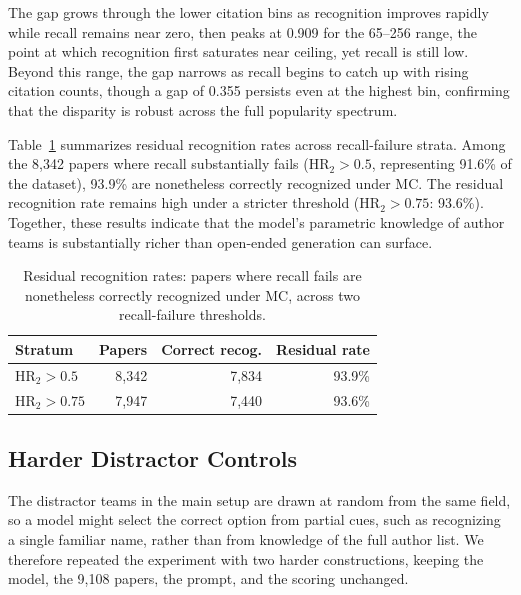\documentclass[11pt]{article}
\begin{document}
The gap grows through the lower citation bins as recognition improves rapidly while recall remains near zero, then peaks at 0.909 for the 65--256 range, the point at which recognition first saturates near ceiling, yet recall is still low.
Beyond this range, the gap narrows as recall begins to catch up with rising citation counts, though a gap of 0.355 persists even at the highest bin, confirming that the disparity is robust across the full popularity spectrum.

Table~\ref{tab:residual_knowledge} summarizes residual recognition rates across recall-failure strata.
Among the 8{,}342 papers where recall substantially fails ($\text{HR}_2 > 0.5$, representing 91.6\% of the dataset), 93.9\% are nonetheless correctly recognized under MC. The residual recognition rate remains high under a stricter threshold ($\text{HR}_2 > 0.75$: 93.6\%). Together, these results indicate that the model's parametric knowledge of author teams is substantially richer than open-ended generation can surface.

\setlength{\tabcolsep}{4pt}
\begin{table}[htbp]
  \centering
  \footnotesize
  \begin{tabular}{@{}lrrr@{}}
    \toprule
    \textbf{Stratum} & \textbf{Papers} & \textbf{Correct recog.} & \textbf{Residual rate} \\
    \midrule
    $\text{HR}_2 > 0.5$ & 8{,}342& 7{,}834 & 93.9\% \\
    $\text{HR}_2 > 0.75$ & 7{,}947& 7{,}440 & 93.6\% \\
    \bottomrule
  \end{tabular}
  \caption{Residual recognition rates: papers where recall fails are nonetheless correctly recognized under MC, across two recall-failure thresholds.}
  \label{tab:residual_knowledge}
\end{table}

\subsection{Harder Distractor Controls}
\label{sec:appendix_hard_distractors}

The distractor teams in the main setup are drawn at random from the same field, so a model might select the correct option from partial cues, such as recognizing a single familiar name, rather than from knowledge of the full author list. We therefore repeated the experiment with two harder constructions, keeping the model, the 9{,}108 papers, the prompt, and the scoring unchanged.
\end{document}
